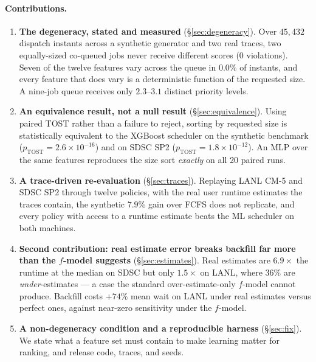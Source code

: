\documentclass[11pt,twocolumn]{article}
\begin{document}
\paragraph{Contributions.}
\begin{enumerate}
  \item \textbf{The degeneracy, stated and measured} (\S\ref{sec:degeneracy}).
        Over $45{,}432$ dispatch instants across a synthetic generator and two
        real traces, two equally-sized co-queued jobs never receive different
        scores (0 violations). Seven of the twelve features vary across the
        queue in $0.0\%$ of instants, and every feature that does vary is a
        deterministic function of the requested size. A nine-job queue receives
        only $2.3$--$3.1$ distinct priority levels.
  \item \textbf{An equivalence result, not a null result}
        (\S\ref{sec:equivalence}). Using paired TOST rather than a failure to
        reject, sorting by requested size is statistically equivalent to the
        XGBoost scheduler on the synthetic benchmark
        ($p_{\mathrm{TOST}} = 2.6\times10^{-16}$) and on SDSC SP2
        ($p_{\mathrm{TOST}} = 1.8\times10^{-12}$). An MLP over the same features
        reproduces the size sort \emph{exactly} on all 20 paired runs.
  \item \textbf{A trace-driven re-evaluation} (\S\ref{sec:traces}). Replaying
        LANL CM-5 and SDSC SP2 through twelve policies, with the real user
        runtime estimates the traces contain, the synthetic $7.9\%$ gain over
        FCFS does not replicate, and every policy with access to a runtime
        estimate beats the ML scheduler on both machines.
  \item \textbf{Second contribution: real estimate error breaks backfill far
        more than the $f$-model suggests} (\S\ref{sec:estimates}). Real estimates are
        $6.9\times$ the runtime at the median on SDSC but only $1.5\times$ on
        LANL, where $36\%$ are \emph{under}-estimates --- a case the standard
        over-estimate-only $f$-model cannot produce. Backfill costs $+74\%$ mean
        wait on LANL under real estimates versus perfect ones, against near-zero
        sensitivity under the $f$-model.
  \item \textbf{A non-degeneracy condition and a reproducible harness}
        (\S\ref{sec:fix}). We state what a feature set must contain to make
        learning matter for ranking, and release code, traces, and seeds.
\end{enumerate}
\end{document}
